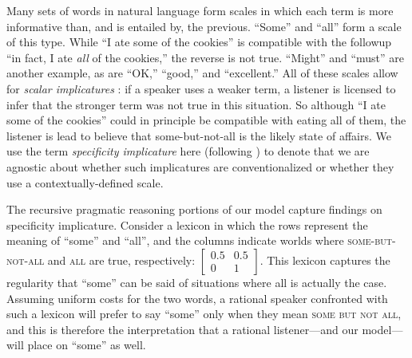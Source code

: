 \documentclass{article} %
\begin{document}
Many sets of words in natural language form scales in which each term
is more informative than, and is entailed by, the previous. ``Some'' and ``all'' form a scale of this
type. While ``I ate some of the cookies'' is compatible with the
followup ``in fact, I ate {\it all} of the cookies,'' the reverse is
not true. ``Might'' and ``must'' are another example, as are ``OK,''
``good,'' and ``excellent.'' All of these scales allow for {\it scalar
  implicatures} \cite{grice1975}: if a speaker uses a weaker term, a
listener is licensed to infer that the stronger term was not true in
this situation. So although ``I ate some of the cookies'' could in
principle be compatible with eating {\sc all} of them, the listener is lead
to believe that {\sc some-but-not-all} is the likely state of
affairs. We use the term {\it specificity implicature} here (following
\cite{bergen2012}) to denote that we are agnostic about whether such
implicatures are conventionalized or whether they use a
contextually-defined scale.

The recursive pragmatic reasoning portions of our model capture
findings on specificity implicature. Consider a lexicon in which the
rows represent the meaning of ``some'' and ``all'', and the columns
indicate worlds where \textsc{some-but-not-all} and \textsc{all} are
true, respectively: $\left[
    \begin{array}{cc}
      0.5 & 0.5 \\
      0 & 1
    \end{array}
  \right]$. This lexicon captures the regularity that ``some'' can be said of
  situations where {\sc all} is actually the case. Assuming uniform
  costs for the two words, a rational speaker confronted with such a
  lexicon will prefer to say ``some'' only when they mean \textsc{some
    but not all}, and this is therefore the interpretation that a
  rational listener---and our model---will place on ``some'' as well.

  
\end{document}

